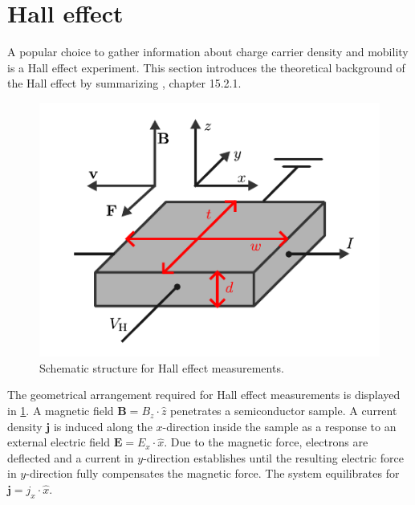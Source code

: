 \section{Hall effect}
A popular choice to gather information about charge carrier density and mobility
is a Hall effect experiment. 
This section introduces the theoretical background of the Hall effect 
by summarizing , chapter 15.2.1.

\begin{figure}
	\centering
	\includegraphics{../assets/hall_geometry.pdf}
	\caption{Schematic structure for Hall effect measurements.
		}
	\label{fig:hall}
\end{figure}
The geometrical arrangement required for Hall effect measurements
is displayed in \cref{fig:hall}.
A magnetic field $\mathbf{B}=B_z \cdot \hat{z}$ penetrates
a semiconductor sample.
A current density $\mathbf{j}$ is induced along the $x$-direction inside the sample 
as a response to an external electric field $\mathbf{E}=E_x \cdot \hat{x}$.
Due to the magnetic force, electrons are deflected and a current in
$y$-direction establishes until the resulting electric force in $y$-direction
fully compensates the magnetic force.
The system equilibrates for $\mathbf{j} = j_x \cdot \hat{x}$.

